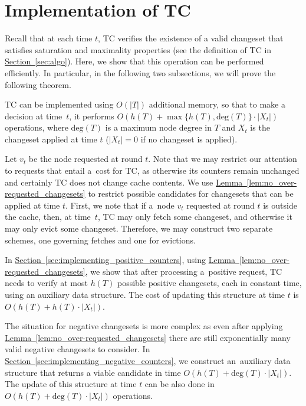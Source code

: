 \documentclass[sigconf,screen=true]{acmart}
\newcommand{\lref}[2][]{\hyperref[#2]{#1~\ref*{#2}}}
\newcommand{\ALG}{\textsc{TC}\xspace}
\newcommand{\degree}{\textrm{deg}}
\begin{document}

\section{Implementation of TC}\label{sec:implementing_counters}

Recall that at each time $t$, \ALG verifies the existence of a valid changeset
that satisfies saturation and maximality properties (see the definition of
\ALG in \lref[Section]{sec:algo}). Here, we show that this operation can be
performed efficiently. In particular, in the following two subsections, we
will prove the following theorem.

\begin{theorem}
\ALG can be implemented using $O(|T|)$ additional memory, so that to make a
decision at time~$t$, it performs $O(h(T) + \max \{ h(T), \degree(T) \} \cdot |X_t|)$ operations,
where $\degree(T)$ is a maximum node degree in $T$ and 
$X_t$ is the changeset applied at time $t$ ($|X_t| = 0$ if no changeset is
applied). 
\end{theorem}


Let $v_t$ be the node requested at round $t$. Note that we may restrict our
attention to requests that entail a~cost for \ALG, as otherwise its counters
remain unchanged and certainly \ALG does not change cache contents. We use
\lref[Lemma]{lem:no_over-requested_changesets} to restrict possible candidates
for changesets that can be applied at time $t$. First, we note that if a~node
$v_t$ requested at round $t$ is outside the cache, then, at time~$t$, \ALG may
only fetch some changeset, and otherwise it may only evict some changeset.
Therefore, we may construct two separate schemes, one governing fetches and
one for evictions.

In \lref[Section]{sec:implementing_positive_counters}, using 
\lref[Lemma]{lem:no_over-requested_changesets}, we show that after processing 
a~positive request, \ALG needs to verify at most $h(T)$ possible positive changesets,
each in constant time, using an auxiliary data
structure. The cost of updating this structure at time $t$ is 
$O(h(T) + h(T) \cdot |X_t|)$.

The situation for negative changesets is more complex as even after applying
\lref[Lemma]{lem:no_over-requested_changesets} there are still exponentially
many valid negative changesets to consider. In
\lref[Section]{sec:implementing_negative_counters}, we construct an~auxiliary
data structure that returns a viable candidate in time $O(h(T) + \degree(T)
\cdot |X_t|)$. The update of this structure at time $t$ can be also done in
$O(h(T) + \degree(T) \cdot |X_t|)$ operations.
\end{document}
